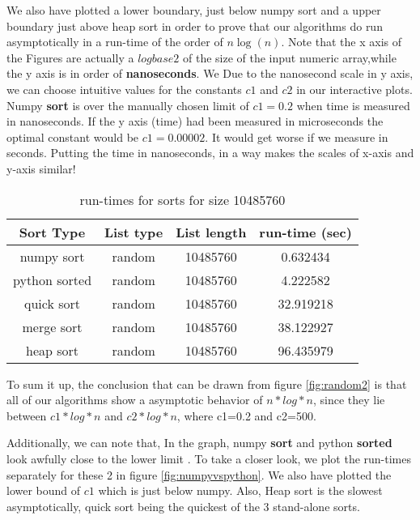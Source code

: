 \documentclass[sigconf, nonacm, natbib, screen, balance=False]{acmart}
\begin{document}
We also have plotted a lower boundary, just below numpy sort and a upper boundary just above heap sort in order to prove that our algorithms do run asymptotically in a run-time of the order of \textbf{$n\log(n)$}. Note that the x axis of the Figures are actually a $log base 2$ of the size of the input numeric array,while the y axis is in order of \textbf{nanoseconds}. We  Due to the nanosecond scale in y axis, we can choose intuitive values for the constants $c1$ and $c2$  in our interactive plots. Numpy \textbf{sort} is over the manually chosen limit of \textbf{$c1=0.2$} when time is measured in nanoseconds. If the y axis (time) had been measured in microseconds the optimal constant would be $c1=0.00002$. It would get worse if we measure in seconds. Putting the time in nanoseconds, in a way makes the scales of x-axis and y-axis similar!

\begin{table}[ht]
\caption{run-times for sorts for size 10485760}
\label{tab:table1}
\begin{center}
\begin{tabular}{|c|c|c|c|} 
\hline
Sort Type & List type & List length & run-time (sec) \\
\hline
numpy sort &	random &	10485760 &	0.632434 \\
python sorted &	random &	10485760 &	4.222582 \\
quick sort &	random &	10485760 &	32.919218 \\
merge sort &	random &	10485760 &	38.122927 \\
heap sort &	random &	10485760 &	96.435979 \\
\hline
\end{tabular}
\end{center}
\end{table}

To sum it up, the conclusion that can be drawn from figure \ref{fig:random2} is that all of our algorithms show a asymptotic behavior of $n*log*n$, since they lie between $c1*log*n$ and $c2*log*n$, where c1=0.2 and c2=500. 

Additionally, we can note that, In the graph, numpy \textbf{sort} and python \textbf{sorted} look awfully close to the lower limit . To take a closer look, we plot the run-times separately for these 2 in  figure \ref{fig:numpyvspython}. We also have plotted the lower bound of $c1$ which is just below numpy. Also, Heap sort is the slowest asymptotically, quick sort being the quickest of the 3 stand-alone sorts.
\end{document}
